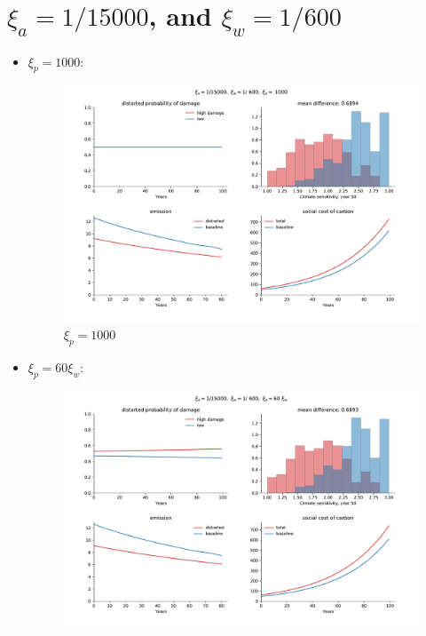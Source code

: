 \documentclass{article}
\begin{document}
\doublespacing
\section{\(\xi_a= 1/15000\), and \(\xi_w=1/600\)}\label{sec:sec1}

\begin{itemize}
    \item$\xi_p= 1000$:
        \begin{figure}[H]
            \centering
            \includegraphics[width=\linewidth]{notebook/15_600_1000.pdf}
            \caption{$\xi_p= 1000$}
            \label{fig:notebook/15_600_1000}
        \end{figure}
        \newpage
    \item$\xi_p= 60\xi_w$:
        \begin{figure}[H]
            \centering
            \includegraphics[width=\linewidth]{notebook/15_600_60.pdf}

\end{figure}
\end{itemize}
\end{document}
